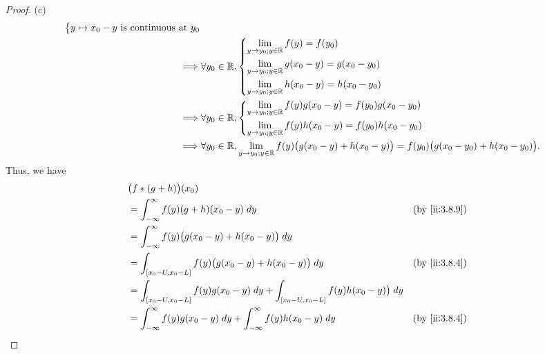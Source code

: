 \begin{proof}{(c)}
\begin{align*}
\begin{dcases}
                                     y \mapsto x_0 - y \text{ is continuous at } y_0
                                   \end{dcases}                                                                     \\
    \implies & \forall y_0 \in \mathbb{R}, \begin{dcases}
                                     \lim_{y \to y_0 ; y \in \mathbb{R}} f(y) = f(y_0)             \\
                                     \lim_{y \to y_0 ; y \in \mathbb{R}} g(x_0 - y) = g(x_0 - y_0) \\
                                     \lim_{y \to y_0 ; y \in \mathbb{R}} h(x_0 - y) = h(x_0 - y_0)
                                   \end{dcases}                                                              \\
    \implies & \forall y_0 \in \mathbb{R}, \begin{dcases}
                                     \lim_{y \to y_0 ; y \in \mathbb{R}} f(y) g(x_0 - y) = f(y_0) g(x_0 - y_0) \\
                                     \lim_{y \to y_0 ; y \in \mathbb{R}} f(y) h(x_0 - y) = f(y_0) h(x_0 - y_0)
                                   \end{dcases}                                                  \\
    \implies & \forall y_0 \in \mathbb{R}, \lim_{y \to y_0 ; y \in \mathbb{R}} f(y) \big(g(x_0 - y) + h(x_0 - y)\big) = f(y_0) \big(g(x_0 - y_0) + h(x_0 - y_0)\big).
  \end{align*}
  Thus, we have
  \begin{align*}
     & \big(f * (g + h)\big)(x_0)                                                                                                  \\
     & = \int_{-\infty}^\infty f(y) (g + h)(x_0 - y) \; dy                                                      &  & \by{ii:3.8.9} \\
     & = \int_{-\infty}^\infty f(y) \big(g(x_0 - y) + h(x_0 - y)\big) \; dy                                                        \\
     & = \int_{[x_0 - U, x_0 - L]} f(y) \big(g(x_0 - y) + h(x_0 - y)\big) \; dy                                 &  & \by{ii:3.8.4} \\
     & = \int_{[x_0 - U, x_0 - L]} f(y) g(x_0 - y) \; dy + \int_{[x_0 - U, x_0 - L]} f(y) h(x_0 - y)\big) \; dy                    \\
     & = \int_{-\infty}^\infty f(y) g(x_0 - y) \; dy + \int_{-\infty}^\infty f(y) h(x_0 - y) \; dy              &  & \by{ii:3.8.4} \\

\end{align*}
\end{proof}
